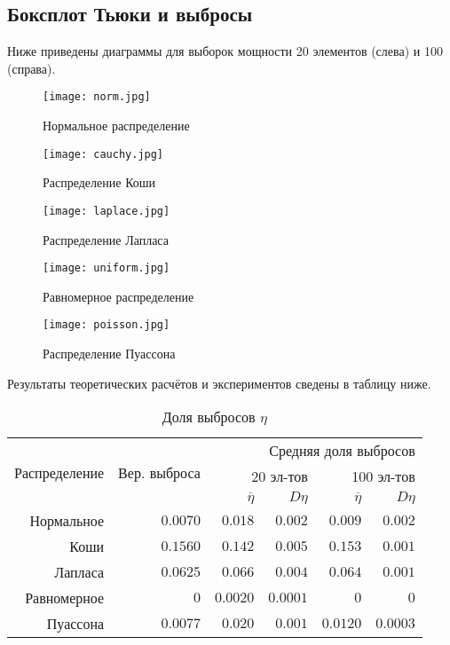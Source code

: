 \documentclass[zuev_report2.tex]{subfiles}
\begin{document}
\subsection{Боксплот Тьюки и выбросы}
Ниже приведены диаграммы для выборок мощности 20 элементов (слева) и 100 (справа). 
\begin{figure}[H]
	\centering \texttt{[image: norm.jpg]}
	\caption{Нормальное распределение}
	\label{img:norm}
\end{figure}
\begin{figure}[H]
	\centering \texttt{[image: cauchy.jpg]}
	\caption{Распределение Коши}
	\label{img:cauchy}
\end{figure}
\begin{figure}[H]
	\centering \texttt{[image: laplace.jpg]}
	\caption{Распределение Лапласа}
	\label{img:laplace}
\end{figure}
\begin{figure}[H]
	\centering \texttt{[image: uniform.jpg]}
	\caption{Равномерное распределение}
	\label{img:uniform}
\end{figure}
\begin{figure}[H]
	\centering \texttt{[image: poisson.jpg]}
	\caption{Распределение Пуассона}
	\label{img:poisson}
\end{figure}
\newpage

Результаты теоретических расчётов и экспериментов сведены в таблицу ниже.
\begin{table}[H]
\centering
\caption{Доля выбросов $\eta$}
\begin{tabular}{*6r}
	\toprule
	\multirow{3}{*}{Распределение}&
	\multirow{3}{*}{Вер. выброса}&
	\multicolumn{4}{r}{Средняя доля выбросов}\tabularnewline
	& & \multicolumn{2}{r}{20 эл-тов} & \multicolumn{2}{r}{100 эл-тов}\\
	& & $\overline{\eta}$ & $D\eta$ & $\overline{\eta}$ & $D\eta$ \\
	\midrule
	Нормальное  & $0.0070$ & $0.018$ & $0.002$ & $0.009$ & $0.002$ \\
	Коши        & $0.1560$ & $0.142$ & $0.005$  & $0.153$ & $0.001$ \\
	Лапласа     & $0.0625$ & $0.066$ & $0.004$ & $0.064$ & $0.001$ \\
	Равномерное & $0$ & $0.0020$ & $0.0001$ & $0$  & $0$\\
	Пуассона    & $0.0077$ & $0.020$ & $0.001$ & $0.0120$ & $0.0003$ \\
	\bottomrule
\end{tabular}
\label{table:outliers}
\end{table}
\end{document}
